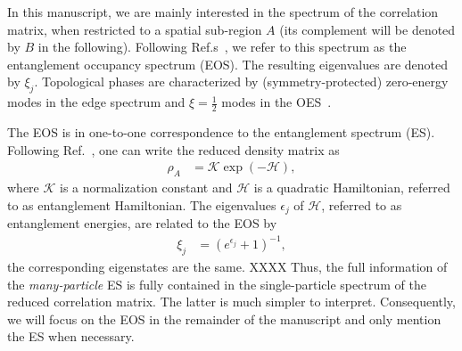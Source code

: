 \documentclass[twocolumn,amsmath,longbibliography,amssymb,superscriptaddress]{revtex4-1}
\newcommand{\mariac}[1]{{\it\color{cyan}#1}}
\begin{document}
In this manuscript, we are mainly interested in the spectrum of the correlation matrix, when restricted to a spatial sub-region $A$ (its complement will be denoted by $B$ in the following). 
Following Ref.s~\cite{Huang2012,Huang2012-2}, we refer to this spectrum as the entanglement occupancy spectrum (EOS). 
The resulting eigenvalues  are denoted by $\xi_j$. 
Topological phases are characterized by (symmetry-protected) zero-energy modes in the edge spectrum and $\xi=\frac 1 2$ modes in the OES~\cite{Fidkowski2010entanglement}.
 

The EOS is in one-to-one correspondence to the entanglement spectrum (ES). 
Following Ref.~\cite{Peschel2008}, one can write the  reduced density matrix as 
\begin{align}\label{eq:red_dens_mat}
\rho_A&=\mathcal{K} \exp(-\mathcal H),
\end{align}
where $\mathcal{K}$ is a normalization constant and $\mathcal{H}$ is a quadratic Hamiltonian, referred to as entanglement Hamiltonian. 
The eigenvalues $\epsilon_j$ of $\mathcal{H}$, referred to as entanglement energies,  are related to the EOS by 
\begin{align}
\xi_j &=\left(e^{\epsilon_j}+1\right)^{-1}, 
\end{align}
the corresponding eigenstates are the same. 
XXXX
Thus, the full information of the \emph{many-particle} ES is fully contained in the single-particle spectrum of the reduced correlation matrix. 
The latter is much simpler to interpret. 
Consequently, we will focus on the EOS in the remainder of the manuscript and only mention the ES when necessary. 

\end{document}
